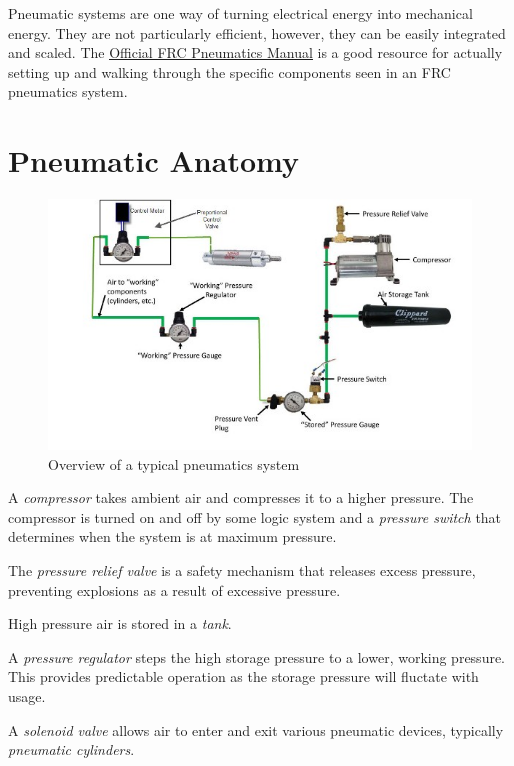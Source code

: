 \documentclass[10pt,letterpaper]{book}
\begin{document}
Pneumatic systems are one way of turning electrical energy into mechanical energy. They are not particularly efficient, however, they can be easily integrated and scaled. The \href{http://www.team358.org/files/pneumatic/2017pneumatics-manual.pdf}{\color{red}\underline{Official FRC Pneumatics Manual}} is a good resource for actually setting up and walking through the specific components seen in an FRC pneumatics system.

\section{Pneumatic Anatomy}

\begin{figure}[H]
	\includegraphics[width=\textwidth]{imgs/pneumatics_overview.jpeg}
	\caption{Overview of a typical pneumatics system}
\end{figure}

\begin{asparaenum}[a)]
	\item A \textit{compressor} takes ambient air and compresses it to a higher pressure. The compressor is turned on and off by some logic system and a \textit{pressure switch} that determines when the system is at maximum pressure.
	\item The \textit{pressure relief valve} is a safety mechanism that releases excess pressure, preventing explosions as a result of excessive pressure.
	\item High pressure air is stored in a \textit{tank}.
	\item A \textit{pressure regulator} steps the high storage pressure to a lower, working pressure. This provides predictable operation as the storage pressure will fluctate with usage.
	\item A \textit{solenoid valve} allows air to enter and exit various pneumatic devices, typically \textit{pneumatic cylinders}.
\end{asparaenum}
\end{document}
